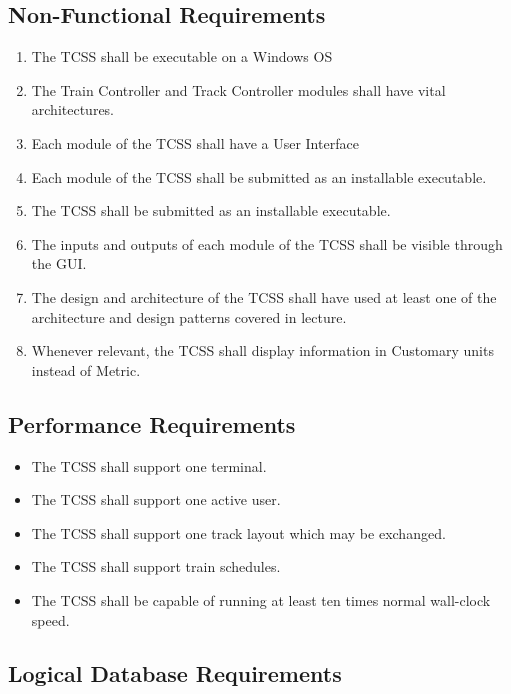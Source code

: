 \documentclass{article}
\begin{document}
    \subsection{Non-Functional Requirements}
     \begin{enumerate}
        \item The TCSS shall be executable on a Windows OS
        \item The Train Controller  and Track Controller  modules shall have vital architectures.
        \item Each module of the TCSS shall have a User Interface 
        \item Each module of the TCSS shall be submitted as an installable executable.
        \item The TCSS shall be submitted as an installable executable.
        \item The inputs and outputs of each module of the TCSS shall be visible through the GUI.
        \item The design and architecture of the TCSS shall have used at least one of the architecture and design patterns covered in lecture.
        \item Whenever relevant, the TCSS shall display information in Customary units instead of Metric.
    \end{enumerate}
    
    \subsection{Performance Requirements}
    
    \begin{itemize}
        \item The TCSS shall support one terminal.
        \item The TCSS shall support one active user.
        \item The TCSS shall support one track layout which may be exchanged.
        \item The TCSS shall support train schedules.
        \item The TCSS shall be capable of running at least ten times normal wall-clock speed.
    \end{itemize}
    
    \subsection{Logical Database Requirements}
\end{document}
